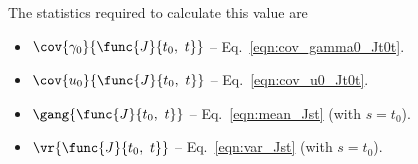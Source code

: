The statistics required to calculate this value are

\begin{itemize}
	\item [] $\cov{\gamma_0}{\func{J}{t_0,\ t}}$ -- Eq.~\ref{eqn:cov_gamma0_Jt0t}.
	\item [] $\cov{u_0}{\func{J}{t_0,\ t}}$ -- Eq.~\ref{eqn:cov_u0_Jt0t}.
	\item [] $\gang{\func{J}{t_0,\ t}}$ -- Eq.~\ref{eqn:mean_Jst} (with $s = t_0$).
	\item [] $\vr{\func{J}{t_0,\ t}}$ -- Eq.~\ref{eqn:var_Jst} (with $s = t_0$).
\end{itemize}